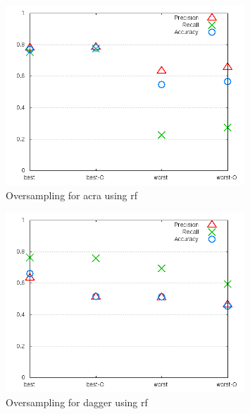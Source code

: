 \begin{figure}[!t]
    \centering

        \includegraphics[width=0.8\textwidth]{images/rf/test_4/acra_sample_range}
        \caption{Oversampling for acra using \gls{rf}}
        \label{fig:test_4_acra_rf}
\end{figure}

\begin{figure}[!ht]
    \centering
        \includegraphics[width=0.8\textwidth]{images/rf/test_4/dagger_sample_range}
        \caption{Oversampling for dagger using \gls{rf}}
        \label{fig:test_4_dagger_rf}
\end{figure}



